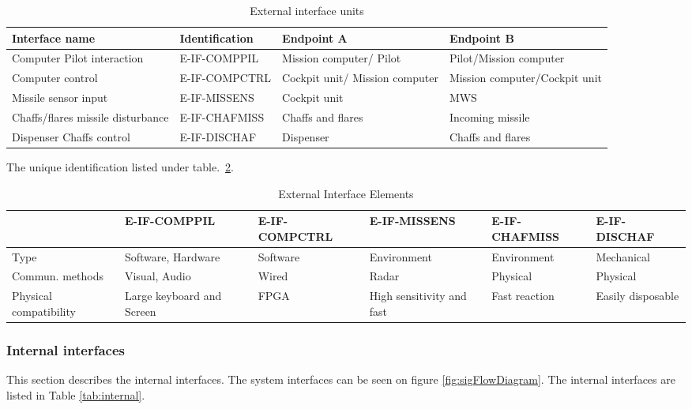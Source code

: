\begin{table}[h]
\centering
\caption{External interface units}
\label{tab:External}
\begin{tabular}{ | p{2cm} | l | p{3.8cm} | p{3.8cm} |}
\hline
\textbf{Interface name} & \textbf{Identification} & \textbf{Endpoint A} & \textbf{Endpoint B}\\ \hline
Computer Pilot interaction & E-IF-COMPPIL & Mission computer/ Pilot & Pilot/Mission computer\\ \hline
Computer control & E-IF-COMPCTRL & Cockpit unit/ Mission computer &Mission computer/Cockpit unit\\ \hline
Missile sensor input & E-IF-MISSENS & Cockpit unit & MWS\\ \hline
Chaffs/flares missile disturbance& E-IF-CHAFMISS & Chaffs and flares & Incoming missile \\ \hline
Dispenser Chaffs control & E-IF-DISCHAF & Dispenser & Chaffs and flares \\ \hline
\end{tabular}
\end{table}

 The unique identification listed under table.~\ref{tab:External2}. 
 \begin{table}[h]
 \caption{External Interface Elements}
 \label{tab:External2}
 \begin{tabular}{| p{1.5cm} | p{2.3cm} p{2cm} p{2.3cm} p{2.3cm} p{2.3cm} |}
 \hline
&E-IF-COMPPIL&E-IF-COMPCTRL&E-IF-MISSENS&E-IF-CHAFMISS&E-IF-DISCHAF\\
\hline
 Type&Software, Hardware&Software&Environment&Environment&Mechanical\\
 \hline
 Commun. methods&Visual, Audio & Wired & Radar & Physical & Physical\\
 \hline
 Physical compatibility&Large keyboard and Screen&FPGA&High sensitivity and fast&Fast reaction&Easily disposable\\
 \hline
 \end{tabular}
 \end{table}

\clearpage
  \subsubsection{Internal interfaces}
This section describes the internal interfaces. The system interfaces can be seen on figure \ref{fig:sigFlowDiagram}. The internal interfaces are listed in Table \ref{tab:internal}.


